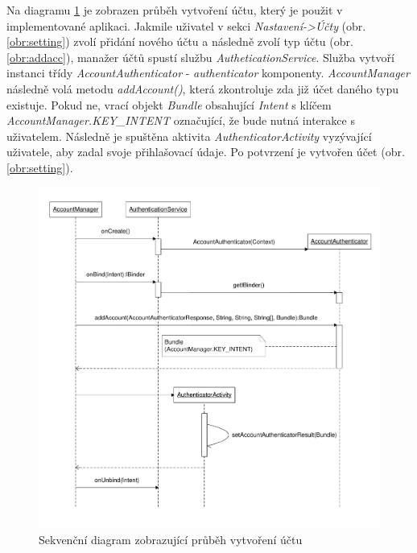 \documentclass{diplomka}
\begin{document}
Na diagramu \ref{obr:andauth} je zobrazen průběh vytvoření účtu, který je použit v implementované aplikaci. Jakmile uživatel v sekci \emph{Nastavení->Účty} (obr. \ref{obr:setting}) zvolí přidání nového účtu a následně zvolí typ účtu (obr. \ref{obr:addacc}), manažer účtů spustí službu \emph{AutheticationService}. Služba vytvoří instanci třídy \emph{AccountAuthenticator} - \emph{authenticator} komponenty. \emph{AccountManager} následně volá metodu \emph{addAccount()}, která zkontroluje zda již účet daného typu existuje. Pokud ne, vrací objekt \emph{Bundle} obsahující \emph{Intent} s klíčem \emph{AccountManager.KEY\_INTENT} označující, že bude nutná interakce s uživatelem. Následně je spuštěna aktivita \emph{AuthenticatorActivity} vyzývající uživatele, aby zadal svoje přihlašovací údaje. Po potvrzení je vytvořen účet (obr. \ref{obr:setting}).
\begin{figure}[H]
  \centering
  \includegraphics[scale=0.7]{visio/andauth.pdf}
\caption{Sekvenční diagram zobrazující průběh vytvoření účtu}
\label{obr:andauth}
\end{figure}
\end{document}
